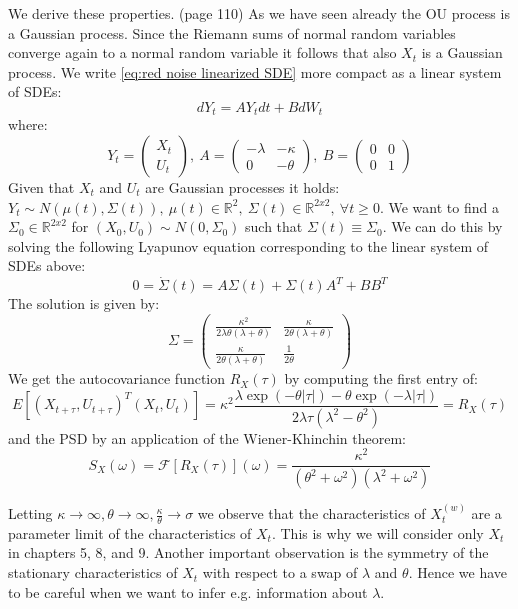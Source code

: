 \documentclass[%
thesis=student,%
coverpage=false,%
titlepage=false,%
headmarks=true, %
english,%
font=libertine, %
math=newpxtx, %
BCOR=5mm,%
coverBCOR=11mm%
]{tumbook}
\begin{document}
We derive these properties. \cite{gardiner:2009}(page 110) As we have seen already the OU process is a Gaussian process. Since the Riemann sums of normal random variables converge again to a normal random variable it follows that also $X_{t}$ is a Gaussian process. We write \eqref{eq:red noise linearized SDE} more compact as a linear system of SDEs: 
\[
dY_{t} = AY_{t}dt + BdW_{t}
\]
where:
\[
Y_{t} = 
\begin{pmatrix}
   X_{t} \\
   U_{t}
\end{pmatrix}
,\ A = 
\begin{pmatrix}
    -\lambda & -\kappa \\
    0        & -\theta
\end{pmatrix}
,\ B = 
\begin{pmatrix}
    0 & 0 \\
    0 & 1
\end{pmatrix}
\]
Given that $X_{t}$ and $U_{t}$ are Gaussian processes it holds: $Y_{t} \sim N(\mu(t),\Sigma(t)),\ \mu(t) \in \mathbb{R}^{2}, \ \Sigma(t) \in \mathbb{R}^{2x2}, \ \forall t\geq 0$. We want to find a $\Sigma_{0} \in \mathbb{R}^{2x2}$ for $(X_{0},U_{0}) \sim N(0,\Sigma_{0})$ such that $\Sigma(t) \equiv \Sigma_{0}$. We can do this by solving the following Lyapunov equation corresponding to the linear system of SDEs above: 
\[
0 = \dot{\Sigma}(t) = A\Sigma(t) + \Sigma(t) A^{T} + BB^{T} 
\]
The solution is given by: 
\[
\Sigma = 
\begin{pmatrix}
    \frac{\kappa^{2}}{2\lambda\theta(\lambda + \theta)} & \frac{\kappa}{2\theta(\lambda + \theta)} \\
    \frac{\kappa}{2\theta(\lambda + \theta)} & \frac{1}{2\theta}
\end{pmatrix}
\]
We get the autocovariance function $R_{X}(\tau)$ by computing the first entry of: 
\[
E[(X_{t+\tau},U_{t+\tau})^{T}(X_{t},U_{t})] = \kappa^{2}\frac{\lambda\exp(-\theta\lvert\tau\rvert)-\theta\exp(-\lambda\lvert\tau\rvert)}{2\lambda\tau(\lambda^{2}-\theta^{2})} = R_{X}(\tau)
\]
and the PSD by an application of the Wiener-Khinchin theorem:
\[
S_{X}(\omega) = \mathcal{F}[R_{X}(\tau)](\omega) = \frac{\kappa^{2}}{(\theta^{2} + \omega^{2})(\lambda^{2} + \omega^{2})}
\]

Letting $\kappa \rightarrow \infty, \theta \rightarrow \infty, \frac{\kappa}{\theta} \rightarrow \sigma$ we observe that the characteristics of $X_{t}^{(w)}$ are a parameter limit of the characteristics of $X_{t}$. This is why we will consider only $X_{t}$ in chapters 5, 8, and 9.
Another important observation is the symmetry of the stationary characteristics of $X_{t}$ with respect to a swap of $\lambda$ and $\theta$. Hence we have to be careful when we want to infer e.g. information about $\lambda$.
\end{document}
